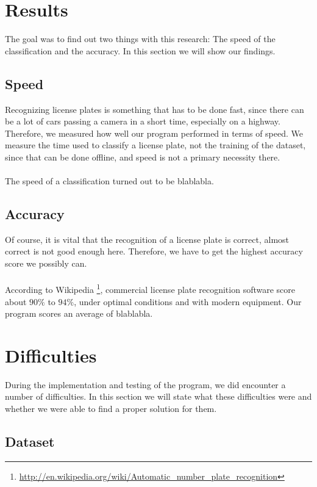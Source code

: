 \documentclass[a4paper]{article}
\begin{document}
\section{Results}

The goal was to find out two things with this research: The speed of the
classification and the accuracy. In this section we will show our findings.

\subsection{Speed}

Recognizing license plates is something that has to be done fast, since there
can be a lot of cars passing a camera in a short time, especially on a highway.
Therefore, we measured how well our program performed in terms of speed. We
measure the time used to classify a license plate, not the training of the
dataset, since that can be done offline, and speed is not a primary necessity
there.\\
\\
The speed of a classification turned out to be blablabla.

\subsection{Accuracy}

Of course, it is vital that the recognition of a license plate is correct,
almost correct is not good enough here. Therefore, we have to get the highest
accuracy score we possibly can.\\
\\ According to Wikipedia
\footnote{
\url{http://en.wikipedia.org/wiki/Automatic_number_plate_recognition}},
commercial license plate recognition software score about $90\%$ to $94\%$,
under optimal conditions and with modern equipment. Our program scores an
average of blablabla.

\section{Difficulties}

During the implementation and testing of the program, we did encounter a
number of difficulties. In this section we will state what these difficulties
were and whether we were able to find a proper solution for them.

\subsection*{Dataset}
\end{document}
